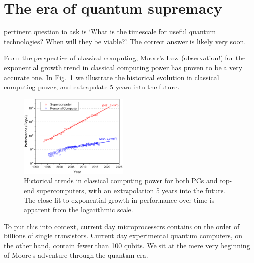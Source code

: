 \section{The era of quantum supremacy} \label{sec:era_quant} 

 pertinent question to ask is `What is the timescale for useful quantum technologies? When will they be viable?'. The correct answer is likely very soon.

From the perspective of classical computing, Moore's Law (observation!) for the exponential growth trend in classical computing power has proven to be a very accurate one. In Fig.~\ref{fig:moores_law} we illustrate the historical evolution in classical computing power, and extrapolate 5 years into the future.

\begin{figure}[!htbp]
\includegraphics[width=0.475\textwidth]{moores_law}
\captionspacefig \caption{Historical trends in classical computing power for both PCs and top-end supercomputers, with an extrapolation 5 years into the future. The close fit to exponential growth in performance over time is apparent from the logarithmic scale.} \label{fig:moores_law}
\end{figure}

To put this into context, current day microprocessors contains on the order of billions of single transistors. Current day  experimental quantum computers, on the other hand, contain fewer than 100 qubits. We sit at the mere very beginning of Moore's adventure through the quantum era.


